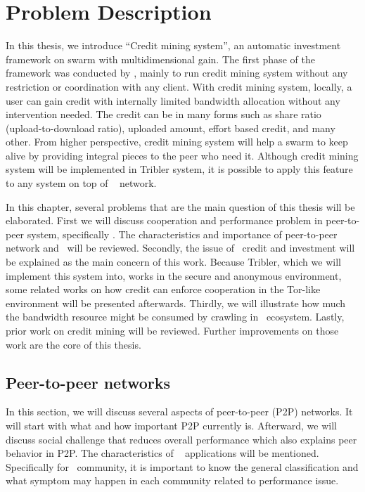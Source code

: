 \chapter{Problem Description}
\label{chp:relwork}
In this thesis, we introduce ``Credit mining system'', an automatic investment framework on swarm with multidimensional gain. The first phase of the framework was conducted by \citeauthor{2015:creditmining:capota}, mainly to run credit mining system without any restriction or coordination with any client. With credit mining system, locally, a user can gain credit with internally limited bandwidth allocation without any intervention needed. The credit can be in many forms such as share ratio (upload-to-download ratio), uploaded amount, effort based credit, and many other. From higher perspective, credit mining system will help a swarm to keep alive by providing integral pieces to the peer who need it. Although credit mining system will be implemented in Tribler system, it is possible to apply this feature to any system on top of \bt~ network.

In this chapter, several problems that are the main question of this thesis will be elaborated. First we will discuss cooperation and performance problem in peer-to-peer system, specifically \bt. The characteristics and importance of peer-to-peer network and \bt~will be reviewed. Secondly, the issue of \bt~credit and investment will be explained as the main concern of this work. Because Tribler, which we will implement this system into, works in the secure and anonymous environment, some related works on how credit can enforce cooperation in the Tor-like environment will be presented afterwards. Thirdly, we will illustrate how much the bandwidth resource might be consumed by crawling in \bt~ecosystem. Lastly, prior work on credit mining will be reviewed. Further improvements on those work are the core of this thesis.

\section{Peer-to-peer networks}
In this section, we will discuss several aspects of peer-to-peer (P2P) networks. It will start with what and how important P2P currently is. Afterward, we will discuss social challenge that reduces overall performance which also explains peer behavior in P2P. The characteristics of \bt~ applications will be mentioned. Specifically for \bt~community, it is important to know the general classification and what symptom may happen in each community related to performance issue. 

